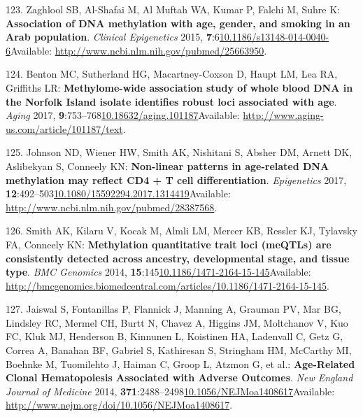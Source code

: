 \documentclass[
]{book}
\begin{document}
\leavevmode\hypertarget{ref-Zaghlool2015}{}%
123. Zaghlool SB, Al-Shafai M, Al Muftah WA, Kumar P, Falchi M, Suhre K: \textbf{Association of DNA methylation with age, gender, and smoking in an Arab population}. \emph{Clinical Epigenetics} 2015, \textbf{7}:6\href{https://doi.org/10.1186/s13148-014-0040-6}{10.1186/s13148-014-0040-6}Available: \url{http://www.ncbi.nlm.nih.gov/pubmed/25663950}.

\leavevmode\hypertarget{ref-Benton2017}{}%
124. Benton MC, Sutherland HG, Macartney-Coxson D, Haupt LM, Lea RA, Griffiths LR: \textbf{Methylome-wide association study of whole blood DNA in the Norfolk Island isolate identifies robust loci associated with age}. \emph{Aging} 2017, \textbf{9}:753--768\href{https://doi.org/10.18632/aging.101187}{10.18632/aging.101187}Available: \url{http://www.aging-us.com/article/101187/text}.

\leavevmode\hypertarget{ref-Johnson2017}{}%
125. Johnson ND, Wiener HW, Smith AK, Nishitani S, Absher DM, Arnett DK, Aslibekyan S, Conneely KN: \textbf{Non-linear patterns in age-related DNA methylation may reflect CD4 + T cell differentiation}. \emph{Epigenetics} 2017, \textbf{12}:492--503\href{https://doi.org/10.1080/15592294.2017.1314419}{10.1080/15592294.2017.1314419}Available: \url{http://www.ncbi.nlm.nih.gov/pubmed/28387568}.

\leavevmode\hypertarget{ref-Smith2014a}{}%
126. Smith AK, Kilaru V, Kocak M, Almli LM, Mercer KB, Ressler KJ, Tylavsky FA, Conneely KN: \textbf{Methylation quantitative trait loci (meQTLs) are consistently detected across ancestry, developmental stage, and tissue type}. \emph{BMC Genomics} 2014, \textbf{15}:145\href{https://doi.org/10.1186/1471-2164-15-145}{10.1186/1471-2164-15-145}Available: \url{http://bmcgenomics.biomedcentral.com/articles/10.1186/1471-2164-15-145}.

\leavevmode\hypertarget{ref-Jaiswal2014c}{}%
127. Jaiswal S, Fontanillas P, Flannick J, Manning A, Grauman PV, Mar BG, Lindsley RC, Mermel CH, Burtt N, Chavez A, Higgins JM, Moltchanov V, Kuo FC, Kluk MJ, Henderson B, Kinnunen L, Koistinen HA, Ladenvall C, Getz G, Correa A, Banahan BF, Gabriel S, Kathiresan S, Stringham HM, McCarthy MI, Boehnke M, Tuomilehto J, Haiman C, Groop L, Atzmon G, et al.: \textbf{Age-Related Clonal Hematopoiesis Associated with Adverse Outcomes}. \emph{New England Journal of Medicine} 2014, \textbf{371}:2488--2498\href{https://doi.org/10.1056/NEJMoa1408617}{10.1056/NEJMoa1408617}Available: \url{http://www.nejm.org/doi/10.1056/NEJMoa1408617}.
\end{document}
